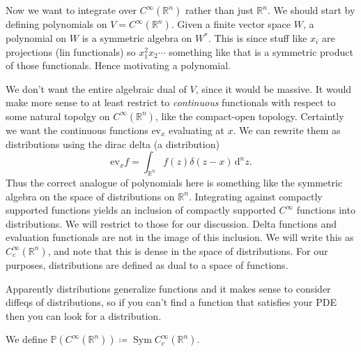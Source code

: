 Now we want to integrate over $C^\infty (\mathbb{R} ^n)$ rather than just $\mathbb{R} ^n$. We should start by defining polynomials on $V=C^\infty (\mathbb{R} ^n)$. Given a finite vector space $W$, a polynomial on $W$ is a symmetric algebra on $W^*$. This is since stuff like $x_i$ are projections (lin functionals) so $x_1^2x_2\cdots $ something like that is a symmetric product of those functionals. Hence motivating a polynomial.

We don't want the entire algebraic dual of $V$, since it would be massive. It would make more sense to at least restrict to \emph{continuous} functionals with respect to some natural topolgy on $C^\infty (\mathbb{R} ^n)$, like the compact-open topology. Certaintly we want the continuous functions $\mathrm{ev} _x$ evaluating at $x$. We can rewrite them as distributions using the dirac delta (a distribution)
\[
	\mathrm{ev}_xf= \int_{\mathbb{R} ^n} f(z)\delta (z-x) \,\mathrm{d} ^nz
.\]
Thus the correct analogue of polynomials here is something like the symmetric algebra on the space of distributions on $\mathbb{R} ^n$. Integrating against compactly supported functions yields an inclusion of compactly supported $C^\infty $ functions into distributions. We will restrict to those for our discussion. Delta functions and evaluation functionals are not in the image of this inclusion. We will write this as $C^\infty _c(\mathbb{R} ^n)$, and note that this is dense in the space of distributions. For our purposes, distributions are defined as dual to a space of functions.

Apparently distributions generalize functions and it makes sense to consider diffeqs of distributions, so if you can't find a function that satisfies your PDE then you can look for a distribution.

We define $\mathbb{P} (C^\infty (\mathbb{R} ^n))\coloneqq \operatorname{Sym} C^\infty _c(\mathbb{R} ^n)$.
